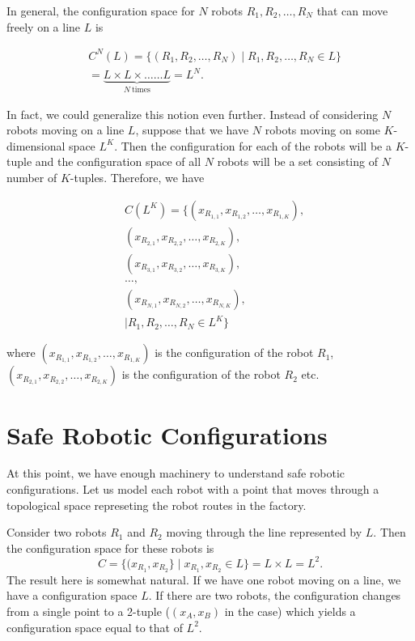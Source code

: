 \documentclass[a4paper, twocolumn]{article}
\theoremstyle{definition}
\begin{document}
In general, the configuration space for $N$ robots $R_1, R_2, \dots, R_N$ that can move freely on a line $L$ is

\begin{align*}
&C^N(L)
= \{(R_1, R_2, \dots, R_N) \mid R_1, R_2, \dots, R_N \in L\}\\
&= \underbrace{L \times L \times \dots \dots L}_{N \ \text{times}} = L^N.
\end{align*}

In fact, we could generalize this notion even further. Instead of considering
$N$ robots moving on a line $L$, suppose that we have $N$ robots moving on some
$K$-dimensional space $L^K$. Then the configuration for each of the robots will
be a $K$-tuple and the configuration space of all $N$ robots will be a set consisting
of $N$ number of $K$-tuples. Therefore, we have

\begin{align*}
&C(L^K) = \{(x_{R_{1,1}}, x_{R_{1,2}}, \dots, x_{R_{1,K}}),\\
&(x_{R_{2,1}}, x_{R_{2,2}}, \dots, x_{R_{2,K}}),\\
&(x_{R_{3,1}}, x_{R_{3,2}}, \dots, x_{R_{3,K}}),\\
&\dots,\\
&(x_{R_{N,1}}, x_{R_{N,2}}, \dots, x_{R_{N,K}}),\\
&\mid R_1, R_2, \dots, R_N \in L^K\}
\end{align*}

where $(x_{R_{1,1}}, x_{R_{1,2}}, \dots, x_{R_{1,K}})$ is the configuration of the robot $R_1$,
$(x_{R_{2,1}}, x_{R_{2,2}}, \dots, x_{R_{2,K}})$ is the configuration of the robot $R_2$ etc.




\section*{Safe Robotic Configurations}
At this point, we have enough machinery to understand safe robotic configurations.
Let us model each robot with a point that moves through a topological space represeting
the robot routes in the factory.

\medskip

Consider two robots $R_1$ and $R_2$ moving through the line represented by $L$.
Then the configuration space for these robots is
$$C = \{(x_{R_1}, x_{R_2}\} \mid x_{R_1}, x_{R_2} \in L\} = L \times L = L^2.$$
The result here is somewhat natural. If we have one robot moving on a line, we have a configuration
space $L$. If there are two robots, the configuration changes from a single point to a 2-tuple ($(x_A, x_B)$ in the case)
which yields a configuration space equal to that of $L^2$.
\end{document}
